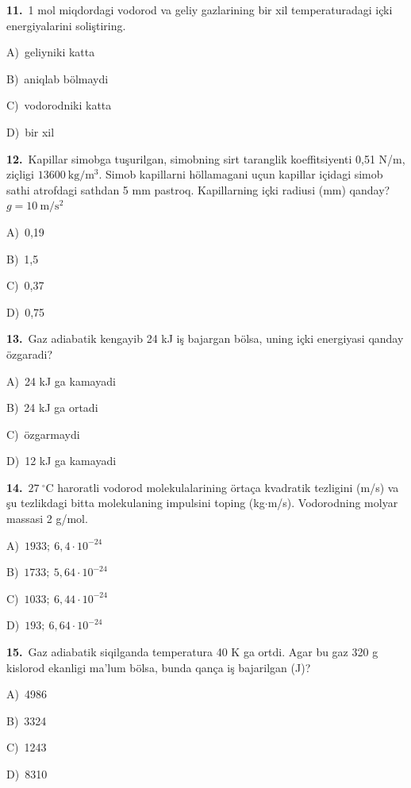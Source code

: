 \documentclass[11pt,a4paper]{article}
\newcommand{\opt}[2]{\hspace*{4mm}#1)\ #2\par}
\begin{document}
\noindent\begin{minipage}{\linewidth}
\textbf{11.}\ 1 mol miqdordagi vodorod va geliy gazlarining bir xil temperaturadagi içki energiyalarini soliştiring.\par\smallskip
\opt{A}{geliyniki katta}
\opt{B}{aniqlab bölmaydi}
\opt{C}{vodorodniki katta}
\opt{D}{bir xil}
\end{minipage}\vspace{9pt}\par
\noindent\begin{minipage}{\linewidth}
\textbf{12.}\ Kapillar simobga tuşurilgan, simobning sirt taranglik koeffitsiyenti 0,51 N/m, ziçligi $13600\ \mathrm{kg/m^3}$. Simob kapillarni höllamagani uçun kapillar içidagi simob sathi atrofdagi sathdan 5 mm pastroq. Kapillarning içki radiusi (mm) qanday? $g=10\ \mathrm{m/s^2}$\par\smallskip
\opt{A}{0,19}
\opt{B}{1,5}
\opt{C}{0,37}
\opt{D}{0,75}
\end{minipage}\vspace{9pt}\par
\noindent\begin{minipage}{\linewidth}
\textbf{13.}\ Gaz adiabatik kengayib 24 kJ iş bajargan bölsa, uning içki energiyasi qanday özgaradi?\par\smallskip
\opt{A}{24 kJ ga kamayadi}
\opt{B}{24 kJ ga ortadi}
\opt{C}{özgarmaydi}
\opt{D}{12 kJ ga kamayadi}
\end{minipage}\vspace{9pt}\par
\noindent\begin{minipage}{\linewidth}
\textbf{14.}\ $27\ ^\circ$C haroratli vodorod molekulalarining örtaça kvadratik tezligini (m/s) va şu tezlikdagi bitta molekulaning impulsini toping (kg$\cdot$m/s). Vodorodning molyar massasi 2 g/mol.\par\smallskip
\opt{A}{$1933;\ 6{,}4\cdot10^{-24}$}
\opt{B}{$1733;\ 5{,}64\cdot10^{-24}$}
\opt{C}{$1033;\ 6{,}44\cdot10^{-24}$}
\opt{D}{$193;\ 6{,}64\cdot10^{-24}$}
\end{minipage}\vspace{9pt}\par
\noindent\begin{minipage}{\linewidth}
\textbf{15.}\ Gaz adiabatik siqilganda temperatura 40 K ga ortdi. Agar bu gaz 320 g kislorod ekanligi ma’lum bölsa, bunda qança iş bajarilgan (J)?\par\smallskip
\opt{A}{4986}
\opt{B}{3324}
\opt{C}{1243}
\opt{D}{8310}
\end{minipage}\vspace{9pt}\par
\end{document}
